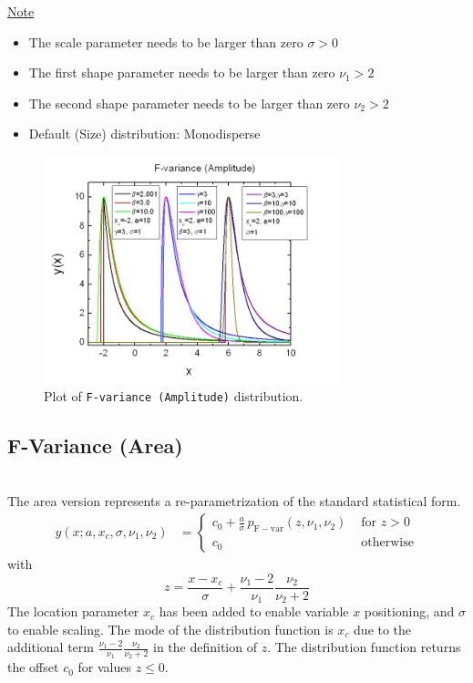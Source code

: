 \underline{Note}
\begin{itemize}
  \item The scale parameter needs to be larger than zero $\sigma>0$
  \item The first shape parameter needs to be larger than zero $\nu_1>2$
  \item The second shape parameter needs to be larger than zero $\nu_2>2$
  \item Default (Size) distribution: Monodisperse
\end{itemize}

\begin{figure}[htb]
\begin{center}
\includegraphics[width=0.768\textwidth]{FvarianceAmplitude.png}
\end{center}
\caption{Plot of \texttt{F-variance (Amplitude)} distribution.}
\label{fig:FvarianceAmplitude}
\end{figure}

\vspace{5mm}
\subsection{F-Variance (Area)} ~\\
\label{sec:FVarianceArea}
The area version represents a re-parametrization of the standard statistical form.
\begin{align}
y(x;a,x_c,\sigma,\nu_1,\nu_2)
&=
\begin{cases}
c_0+\frac{a}{\sigma}\,p_\mathrm{F-var}(z,\nu_1,\nu_2) & \mbox{ for } z>0\\
c_0 & \mbox{ otherwise}
\end{cases}
\end{align}
with
\begin{equation}
z = \frac{x-x_c}{\sigma}+\frac{\nu_1-2}{\nu_1}\frac{\nu_2}{\nu_2+2}
\end{equation}
The location parameter $x_c$ has been added to enable variable $x$ positioning, and $\sigma$
to enable scaling. The mode of the distribution function is $x_c$ due to the additional term
$\frac{\nu_1-2}{\nu_1}\frac{\nu_2}{\nu_2+2}$ in the definition of $z$. The distribution
function returns the offset $c_0$ for values $z\leq 0$.

